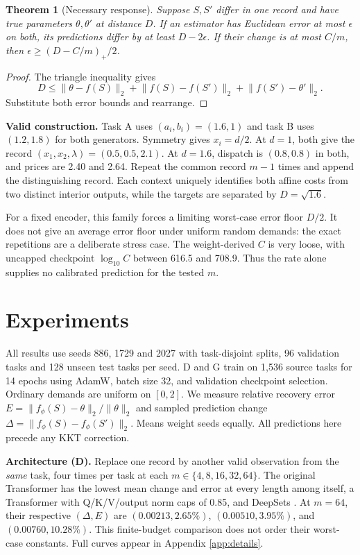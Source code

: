 \documentclass{article}
\newtheorem{theorem}{Theorem}
\newcommand{\norm}[1]{\lVert #1\rVert_2}
\newcommand{\tf}{f_\phi}
\newcommand{\pct}[1]{#1\%}
\begin{document}
\begin{theorem}[Necessary response]
\label{thm:lower}
Suppose \(S,S'\) differ in one record and have true parameters
\(\theta,\theta'\) at distance \(D\). If an estimator has Euclidean
error at most \(\epsilon\) on both, its predictions differ by at
least \(D-2\epsilon\). If their change is at most \(C/m\), then
\(\epsilon\ge(D-C/m)_+/2\).
\end{theorem}
\begin{proof}
The triangle inequality gives
\[
D\le\norm{\theta-f(S)}+\norm{f(S)-f(S')}
     +\norm{f(S')-\theta'}.
\]
Substitute both error bounds and rearrange.
\end{proof}

\textbf{Valid construction.} Task A uses \((a_i,b_i)=(1.6,1)\)
and task B uses \((1.2,1.8)\) for both generators. Symmetry gives
\(x_i=d/2\). At \(d=1\), both give the record
\((x_1,x_2,\lambda)=(0.5,0.5,2.1)\).
At \(d=1.6\), dispatch is \((0.8,0.8)\) in both, and prices are
2.40 and 2.64. Repeat the common record \(m-1\) times and append
the distinguishing record. Each context uniquely identifies both
affine costs from two distinct interior outputs, while the targets
are separated by \(D=\sqrt{1.6}\).

For a fixed encoder, this family forces a limiting worst-case error
floor \(D/2\). It does not give an average error floor under uniform
random demands: the exact repetitions are a deliberate stress case.
The weight-derived \(C\) is very loose, with uncapped checkpoint
\(\log_{10}C\) between 616.5 and 708.9. Thus the rate alone supplies
no calibrated prediction for the tested \(m\).

\section{Experiments}
All results use seeds 886, 1729 and 2027 with task-disjoint splits,
96 validation tasks and 128 unseen test tasks per seed. D and G
train on 1,536 source tasks for 14 epochs using AdamW, batch size
32, and validation checkpoint selection. Ordinary demands are
uniform on \([0,2]\). We measure relative recovery error
\(E=\norm{\tf(S)-\theta}/\norm{\theta}\) and sampled prediction
change \(\Delta=\norm{\tf(S)-\tf(S')}\). Means weight seeds equally.
All predictions here precede any KKT correction.

\textbf{Architecture (D).} Replace one record by another valid
observation from the \emph{same} task, four times per task at each
\(m\in\{4,8,16,32,64\}\). The original Transformer has the lowest
mean change and error at every length among itself, a Transformer
with Q/K/V/output norm caps of 0.85, and DeepSets
\citep{deepsets}. At \(m=64\), their respective
\((\Delta,E)\) are \((0.00213,\pct{2.65})\),
\((0.00510,\pct{3.95})\), and \((0.00760,\pct{10.28})\).
This finite-budget comparison does not order their worst-case
constants. Full curves appear in Appendix \ref{app:details}.
\end{document}
